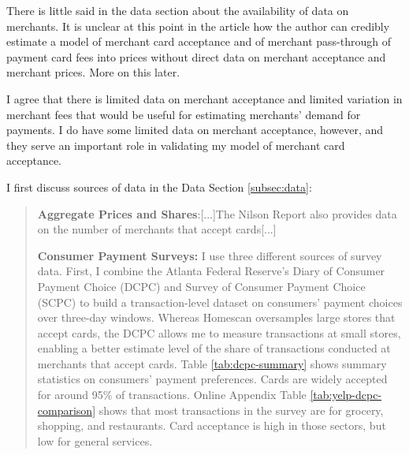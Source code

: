 \documentclass[main.tex]{subfiles}
\begin{document}
\begin{refsection}
\begin{refcomment}
There is little said in the data section about the availability of data on merchants.
It is unclear at this point in the article how the author can credibly estimate a model of merchant card acceptance and of merchant pass-through of payment card fees into prices without direct data on merchant acceptance and merchant prices.
More on this later.
\end{refcomment}

I agree that there is limited data on merchant acceptance and limited variation in merchant fees that would be useful for estimating merchants' demand for payments.
I do have some limited data on merchant acceptance, however, and they serve an important role in validating my model of merchant card acceptance.

I first discuss sources of data in the Data Section \ref{subsec:data}:

\begin{quotation}
    \textbf{Aggregate Prices and Shares}:[...]The Nilson Report also provides data on the number of merchants that accept cards[...]

    \textbf{Consumer Payment Surveys:} I use three different sources of survey data.
First, I combine the Atlanta Federal Reserve's Diary of Consumer Payment Choice (DCPC) and Survey of Consumer Payment Choice (SCPC) to build a transaction-level dataset on consumers' payment choices over three-day windows.
Whereas Homescan oversamples large stores that accept cards, the DCPC allows me to measure transactions at small stores, enabling a better estimate level of the share of transactions conducted at merchants that accept cards.
Table \ref{tab:dcpc-summary} shows summary statistics on consumers' payment preferences.
Cards are widely accepted for around 95\% of transactions.
Online Appendix Table \ref{tab:yelp-dcpc-comparison} shows that most transactions in the survey are for grocery, shopping, and restaurants.
Card acceptance is high in those sectors, but low for general services.
\end{quotation}



\end{refsection}
\end{document}
